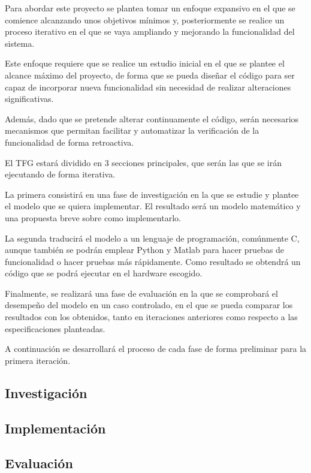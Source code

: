 \documentclass{sty/propuesta}
\begin{document}
Para abordar este proyecto se plantea tomar un enfoque expansivo en el que se comience alcanzando unos objetivos mínimos y, posteriormente se realice un proceso iterativo en el que se vaya ampliando y mejorando la funcionalidad del sistema.

Este enfoque requiere que se realice un estudio inicial en el que se plantee el alcance máximo del proyecto, de forma que se pueda diseñar el código para ser capaz de incorporar nueva funcionalidad sin necesidad de realizar alteraciones significativas.

Además, dado que se pretende alterar continuamente el código, serán necesarios mecanismos que permitan facilitar y automatizar la verificación de la funcionalidad de forma retroactiva.

El TFG estará dividido en 3 secciones principales, que serán las que se irán ejecutando de forma iterativa.

La primera consistirá en una fase de investigación en la que se estudie y plantee el modelo que se quiera implementar. El resultado será un modelo matemático y una propuesta breve sobre como implementarlo.

La segunda traducirá el modelo a un lenguaje de programación, comúnmente C, aunque también se podrán emplear Python y Matlab para hacer pruebas de funcionalidad o hacer pruebas más rápidamente. Como resultado se obtendrá un código que se podrá ejecutar en el hardware escogido.

Finalmente, se realizará una fase de evaluación en la que se comprobará el desempeño del modelo en un caso controlado, en el que se pueda comparar los resultados con los obtenidos, tanto en iteraciones anteriores como respecto a las especificaciones planteadas.

A continuación se desarrollará el proceso de cada fase de forma preliminar para la primera iteración.

\subsection{Investigación}
\subsection{Implementación}
\subsection{Evaluación}

\printbibliography
\end{document}
